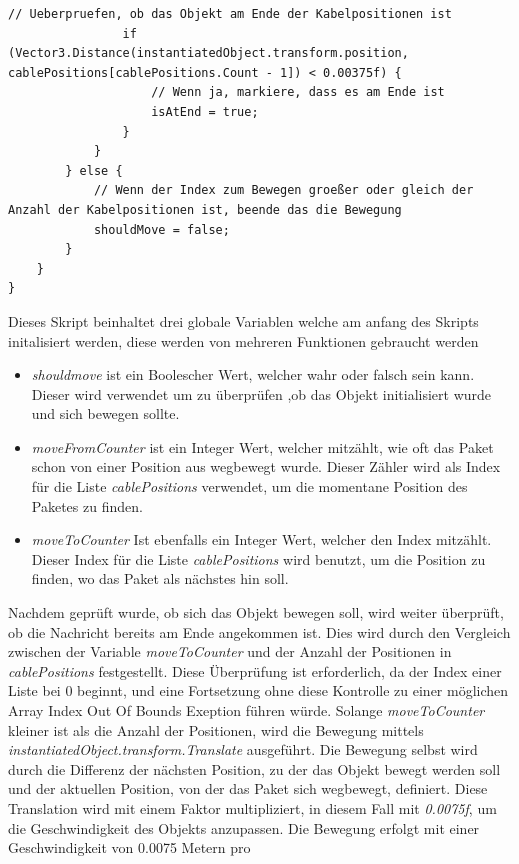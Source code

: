 \begin{itemize}
\begin{lstlisting}[style=csharp, caption={Update Funktion}, label=code:Update]
                // Ueberpruefen, ob das Objekt am Ende der Kabelpositionen ist
                if (Vector3.Distance(instantiatedObject.transform.position, cablePositions[cablePositions.Count - 1]) < 0.00375f) {
                    // Wenn ja, markiere, dass es am Ende ist
                    isAtEnd = true;
                }
            }
        } else {
            // Wenn der Index zum Bewegen groeßer oder gleich der Anzahl der Kabelpositionen ist, beende das die Bewegung
            shouldMove = false;
        }
    }
}
    \end{lstlisting}
    Dieses Skript beinhaltet drei globale Variablen welche am anfang des Skripts initalisiert werden, diese werden von mehreren Funktionen gebraucht werden
    \begin{itemize}
        \item \textit{shouldmove} ist ein Boolescher Wert, welcher wahr oder falsch sein kann. Dieser wird verwendet um zu überprüfen ,ob das Objekt initialisiert wurde und sich bewegen sollte.
        \item \textit{moveFromCounter} ist ein Integer Wert, welcher mitzählt, wie oft das Paket schon von einer Position aus wegbewegt wurde. Dieser Zähler wird als Index für die Liste \textit{cablePositions} verwendet, um die momentane Position des Paketes zu finden.
        \item \textit{moveToCounter} Ist ebenfalls ein Integer Wert, welcher den Index mitzählt. Dieser Index für die Liste \textit{cablePositions} wird benutzt, um die Position zu finden, wo das Paket als nächstes hin soll.
    \end{itemize}
    Nachdem geprüft wurde, ob sich das Objekt bewegen soll, wird weiter überprüft, ob die Nachricht bereits am Ende angekommen
    ist. Dies wird durch den Vergleich zwischen der Variable \textit{moveToCounter} und der Anzahl der Positionen in
    \textit{cablePositions} festgestellt. Diese Überprüfung ist erforderlich, da der Index einer Liste bei 0 beginnt,
    und eine Fortsetzung ohne diese Kontrolle zu einer möglichen Array Index Out Of Bounds Exeption führen würde. Solange
    \textit{moveToCounter} kleiner ist als die Anzahl der Positionen, wird die Bewegung mittels \textit{instantiatedObject.transform.Translate}
    ausgeführt. Die Bewegung selbst wird durch die Differenz der nächsten Position, zu der das Objekt bewegt werden soll und der aktuellen
    Position, von der das Paket sich wegbewegt, definiert. Diese Translation wird mit einem Faktor multipliziert, in diesem Fall mit
    \textit{0.0075f}, um die Geschwindigkeit des Objekts anzupassen. Die Bewegung erfolgt mit einer Geschwindigkeit von 0.0075 Metern pro

\end{itemize}

